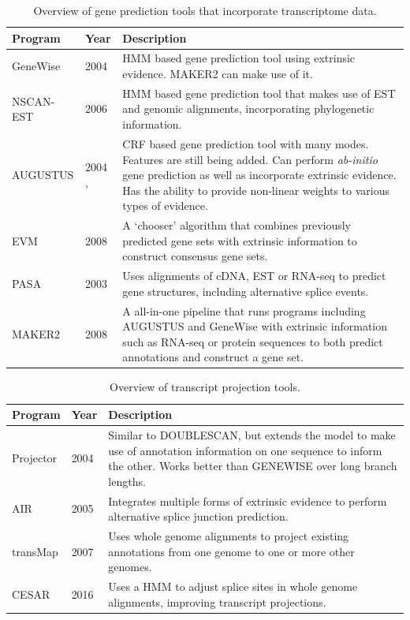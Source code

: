 \documentclass[fleqn,10pt]{wlscirep}
\begin{document}
\begin{table}[ht]
\centering
\begin{tabular}{|l|l|p{12cm}|}
\hline
Program & Year & Description \\
\hline
GeneWise & 2004 \cite{birney2004genewise} & HMM based gene prediction tool using extrinsic evidence. MAKER2 can make use of it. \\
\hline
NSCAN-EST & 2006 \cite{wei2006using} & HMM based gene prediction tool that makes use of EST and genomic alignments, incorporating phylogenetic information. \\
\hline
  AUGUSTUS & 2004 \cite{stanke2004augustus},\cite{stanke2006gene} & CRF based gene prediction tool with many modes. Features are still being added. Can perform \textit{ab-initio} gene prediction as well as incorporate extrinsic evidence. Has the ability to provide non-linear weights to various types of evidence. \\
\hline
EVM & 2008 \cite{haas2008automated,haas2013novo} & A `chooser' algorithm that combines previously predicted gene sets with extrinsic information to construct consensus gene sets. \\
\hline
PASA & 2003 \cite{haas2003improving} & Uses alignments of cDNA, EST or RNA-seq to predict gene structures, including alternative splice events. \\
\hline
MAKER2 & 2008 \cite{cantarel2008maker,yandell2012beginner} & A all-in-one pipeline that runs programs including AUGUSTUS and GeneWise with extrinsic information such as RNA-seq or protein sequences to both predict annotations and construct a gene set. \\
\hline
\end{tabular}
\caption{\label{tab:history_prediction}Overview of gene prediction tools that incorporate transcriptome data.}
\end{table}

\begin{table}[ht]
\centering
\begin{tabular}{|l|l|p{12cm}|}
\hline
Program & Year & Description \\
\hline
Projector & 2004 \cite{meyer2004gene} & Similar to DOUBLESCAN, but extends the model to make use of annotation information on one sequence to inform the other. Works better than GENEWISE over long branch lengths. \\
\hline
AIR & 2005 \cite{florea2005gene} & Integrates multiple forms of extrinsic evidence to perform alternative splice junction prediction. \\
\hline
transMap & 2007 \cite{stanke2008using} & Uses whole genome alignments to project existing annotations from one genome to one or more other genomes. \\
\hline
CESAR & 2016 \cite{sharma2016coding} & Uses a HMM to adjust splice sites in whole genome alignments, improving transcript projections. \\
\hline
\end{tabular}
\caption{\label{tab:history_comparative}Overview of transcript projection tools.}
\end{table}

\clearpage

\end{document}
